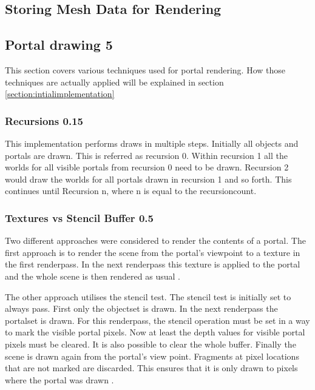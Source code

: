 \subsection{Storing Mesh Data for Rendering}


\subsection{Portal drawing 5}
\label{section:portaldrawing}

This section covers various techniques used for portal rendering. How those techniques are actually applied will be explained in section \ref{section:intialimplementation}

\subsubsection{Recursions 0.15}


This implementation performs draws in multiple steps. Initially all objects and portals are drawn. This is referred as recursion 0. Within recursion 1 all the worlds for all visible portals from recursion 0 need to be drawn. Recursion 2 would draw the worlds for all portals drawn in recursion 1 and so forth. This continues until Recursion n, where n is equal to the \gls{recursioncount}.


\subsubsection{Textures vs Stencil Buffer 0.5}
\label{section:textursVsStencil}
Two different approaches were considered to render the contents of a portal. The first approach is to render the scene from the portal's viewpoint to a texture in the first renderpass. In the next renderpass this texture is applied to the portal and the whole scene is then rendered as usual \cite{schmalstieg:1999:sewing, lecture:portalProblems}.

The other approach utilises the stencil test. The stencil test is initially set to always pass. First only the \gls{objectset} is drawn. In the next renderpass the \gls{portalset} is drawn. For this renderpass, the stencil operation must be set in a way to mark the visible portal pixels. Now at least the depth values for visible portal pixels must be cleared. It is also possible to clear the whole buffer. Finally the scene is drawn again from the portal's view point. Fragments at pixel locations that are not marked are discarded. This ensures that it is only drawn to pixels where the portal was drawn \cites{schmalstieg:1999:sewing, lowe:2005:technique, lecture:portalProblems}.

